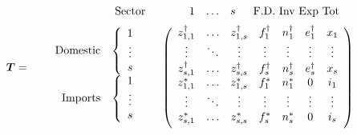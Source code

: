 \documentclass[a4paper]{article}
\begin{document}
\begin{equation}\label{eqn:T}
\begin{array}{rc}
\boldsymbol{T} = & 
\begin{array}{rc}
\begin{array}{cc} & \mbox{Sector} \end{array} 
& 
\begin{array}{cccc} \hspace*{4mm}1 & \mathellipsis & s & \hspace*{2mm} \mbox{F.D. Inv Exp Tot} \end{array} \vspace*{2mm} \\
\begin{array}{r}
\begin{array}{rc}
\mbox{Domestic} & \left\{ \begin{array}{c}
1 \\
\vdots \\
s
\end{array} \right. \\
\mbox{Imports} & \left\{ \begin{array}{c}
1 \\
\vdots \\
s \\
\end{array} \right.
\end{array} \vspace*{2mm} \\
\end{array} &
\left( \begin{array}{ccccccc}
z^{\dag}_{1,1} & \mathellipsis & z^{\dag}_{1,s} & f^\dag_{1} & n^\dag_{1} & e^\dag_{1} & x_1 \\
\vdots & \ddots & \vdots & \vdots & \vdots & \vdots & \vdots \\
z^{\dag}_{s,1} & \mathellipsis & z^{\dag}_{s,s} & f^\dag_{s} & n^\dag_{s} & e^\dag_{s} & x_{s} \\
z^*_{1,1} & \mathellipsis & z^*_{1,s} & f^*_{1} & n^*_{1} & 0 & i_1 \\
\vdots & \ddots & \vdots & \vdots & \vdots & \vdots & \vdots \\
z^*_{s,1} & \mathellipsis & z^*_{s,s} & f^*_{s} & n^*_{s} & 0 & i_{s} \vspace*{2mm} \\
\end{array} \right)
\end{array}
\end{array}
\end{equation}
\end{document}
